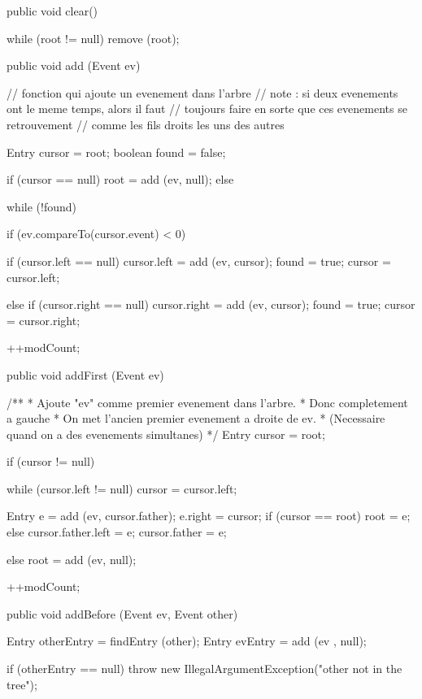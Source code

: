 \begin{hide}
\begin{code}
   public void clear()\begin{hide} {
      while (root != null)
         remove (root);
   }\end{hide}

   public void add (Event ev)\begin{hide} {
      // fonction qui ajoute un evenement dans l'arbre
      // note : si deux evenements ont le meme temps, alors il faut
      //        toujours faire en sorte que ces evenements se retrouvement
      //        comme les fils droits les uns des autres

      Entry cursor = root;
      boolean found = false;

      if (cursor == null)
         root = add (ev, null);
      else {
         while (!found) {
            if (ev.compareTo(cursor.event) < 0) {
               if (cursor.left == null) {
                  cursor.left = add (ev, cursor);
                  found = true;
               }
               cursor = cursor.left;

            } else {
               if (cursor.right == null) {
                  cursor.right = add (ev, cursor);
                  found = true;
               }
               cursor = cursor.right;
            }
         }
      }
      ++modCount;
   }\end{hide}

   public void addFirst (Event ev)\begin{hide} {
   /**
    * Ajoute "ev" comme premier evenement dans l'arbre.
    * Donc completement a gauche
    * On met l'ancien premier evenement a droite de ev.
    * (Necessaire quand on a des evenements simultanes)
    */
      Entry cursor = root;

      if (cursor != null) {
         while (cursor.left != null)
            cursor = cursor.left;

         Entry e = add (ev, cursor.father);
         e.right = cursor;
         if (cursor == root)
            root = e;
         else
            cursor.father.left = e;
         cursor.father = e;
      }
      else
         root = add (ev, null);

      ++modCount;
   }\end{hide}

   public void addBefore (Event ev, Event other)\begin{hide} {
      Entry otherEntry = findEntry (other);
      Entry evEntry    = add (ev , null);

      if (otherEntry == null)
         throw new IllegalArgumentException("other not in the tree");

}
\end{hide}
\end{code}
\end{hide}
